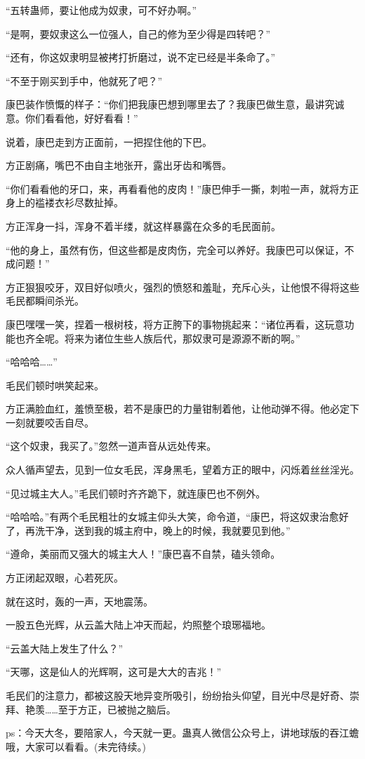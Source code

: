 \begin{this_body}
“五转蛊师，要让他成为奴隶，可不好办啊。”

“是啊，要奴隶这么一位强人，自己的修为至少得是四转吧？”

“还有，你这奴隶明显被拷打折磨过，说不定已经是半条命了。”

“不至于刚买到手中，他就死了吧？”

康巴装作愤慨的样子：“你们把我康巴想到哪里去了？我康巴做生意，最讲究诚意。你们看看他，好好看看！”

说着，康巴走到方正面前，一把捏住他的下巴。

方正剧痛，嘴巴不由自主地张开，露出牙齿和嘴唇。

“你们看看他的牙口，来，再看看他的皮肉！”康巴伸手一撕，刺啦一声，就将方正身上的褴褛衣衫尽数扯掉。

方正浑身一抖，浑身不着半缕，就这样暴露在众多的毛民面前。

“他的身上，虽然有伤，但这些都是皮肉伤，完全可以养好。我康巴可以保证，不成问题！”

方正狠狠咬牙，双目好似喷火，强烈的愤怒和羞耻，充斥心头，让他恨不得将这些毛民都瞬间杀光。

康巴嘿嘿一笑，捏着一根树枝，将方正胯下的事物挑起来：“诸位再看，这玩意功能也齐全呢。将来为诸位生些人族后代，那奴隶可是源源不断的啊。”

“哈哈哈……”

毛民们顿时哄笑起来。

方正满脸血红，羞愤至极，若不是康巴的力量钳制着他，让他动弹不得。他必定下一刻就要咬舌自尽。

“这个奴隶，我买了。”忽然一道声音从远处传来。

众人循声望去，见到一位女毛民，浑身黑毛，望着方正的眼中，闪烁着丝丝淫光。

“见过城主大人。”毛民们顿时齐齐跪下，就连康巴也不例外。

“哈哈哈。”有两个毛民粗壮的女城主仰头大笑，命令道，“康巴，将这奴隶治愈好了，再洗干净，送到我的城主府中，晚上的时候，我就要见到他。”

“遵命，美丽而又强大的城主大人！”康巴喜不自禁，磕头领命。

方正闭起双眼，心若死灰。

就在这时，轰的一声，天地震荡。

一股五色光辉，从云盖大陆上冲天而起，灼照整个琅琊福地。

“云盖大陆上发生了什么？”

“天哪，这是仙人的光辉啊，这可是大大的吉兆！”

毛民们的注意力，都被这股天地异变所吸引，纷纷抬头仰望，目光中尽是好奇、崇拜、艳羡……至于方正，已被抛之脑后。

ps：今天大冬，要陪家人，今天就一更。蛊真人微信公众号上，讲地球版的吞江蟾哦，大家可以看看。(未完待续。)

\end{this_body}

